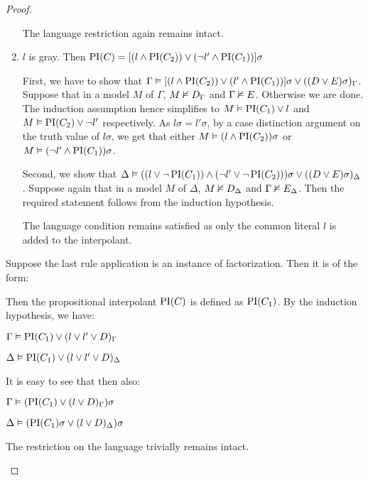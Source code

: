 \begin{proof}
\begin{indproof}
\begin{enumerate}
					The language restriction again remains intact.

				\item $l$ is gray.
					Then $\operatorname{PI}(C) = [(l \land \operatorname{PI}(C_2)) \lor (\lnot l' \land \operatorname{PI}(C_1)) ]\sigma $

					First, we have to show that 
					$ \Gamma \vDash [(l \land \operatorname{PI}(C_2)) \lor (l' \land \operatorname{PI}(C_1)) ]\sigma \lor ((D \lor E)\sigma)_\Gamma$.
					Suppose that in a model $M$ of $\Gamma$, $M \nvDash D_\Gamma$ and $\Gamma \nvDash E$. Otherwise we are done.
					The induction assumption hence simplifies to $M \vDash \operatorname{PI}(C_1) \lor l$ and $M \vDash \operatorname{PI}(C_2) \lor \lnot l'$ respectively.
					As $l\sigma = l'\sigma$, by a case distinction argument on the truth value of $l\sigma$, we get that either $M \vDash (l \land \operatorname{PI}(C_2))\sigma$ or $M \vDash  (\lnot l' \land \operatorname{PI}(C_1))\sigma$.


					Second, we show that 
					$\Delta \vDash ((l \lor \lnot \operatorname{PI}(C_1)) \land (\lnot l' \lor \lnot \operatorname{PI}(C_2)))\sigma \lor ((D \lor E)\sigma)_\Delta$.
					Suppose again that in a model $M$ of $\Delta$, $M \nvDash D_\Delta$ and $\Gamma \nvDash E_\Delta$. 
					Then the required statement follows from the induction hypothesis.

					The language condition remains satisfied as only the common literal $l$ is added to the interpolant.


			\end{enumerate}

			Suppose the last rule application is an instance of factorization. Then it is of the form:
			\begin{prooftree}
			\end{prooftree}

			Then the propositional interpolant $\operatorname{PI}(C)$ is defined as $\operatorname{PI}(C_1)$.
			By the induction hypothesis, we have:

			$\Gamma \vDash \operatorname{PI}(C_1) \lor (l \lor l' \lor D)_\Gamma$

			$\Delta \vDash \operatorname{PI}(C_1) \lor (l \lor l' \lor D)_\Delta$

			It is easy to see that then also:

			$\Gamma \vDash (\operatorname{PI}(C_1)\lor (l \lor D)_\Gamma)\sigma$

			$\Delta \vDash (\operatorname{PI}(C_1)\sigma \lor (l \lor D)_\Delta)\sigma$

			The restriction on the language trivially remains intact.



\end{indproof}
\end{proof}
